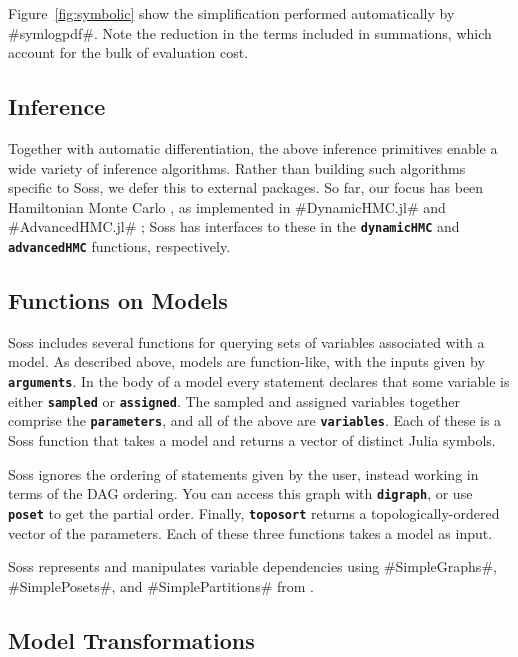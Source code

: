 \documentclass[anonymous=false, %
               format=acmsmall, %
               review=true, %
               screen=true, %
               nonacm=true]{acmart}
\begin{document}
Figure~\ref{fig:symbolic} show the simplification performed automatically by \jl#symlogpdf#. Note the reduction in the terms included in summations, which account for the bulk of evaluation cost. 

\subsection{Inference}

Together with automatic differentiation, the above inference primitives enable a wide variety of inference algorithms. Rather than building such algorithms specific to Soss, we defer this to external packages. So far, our focus has been Hamiltonian Monte Carlo \cite{Neal2011}, as implemented in \jl#DynamicHMC.jl# \cite{tamas_k_papp_2019_3590018} and \jl#AdvancedHMC.jl# \cite{ge2018t}; Soss has interfaces to these in the {\bf \texttt{dynamicHMC}} and {\bf \texttt{advancedHMC}} functions, respectively.

\subsection{Functions on Models}

Soss includes several functions for querying sets of variables associated with a model. As described above, models are function-like, with the inputs given by {\bf \texttt{arguments}}. In the body of a model every statement declares that some variable is either {\bf \texttt{sampled}} or {\bf \texttt{assigned}}. The sampled and assigned variables together comprise the {\bf \texttt{parameters}}, and all of the above are {\bf \texttt{variables}}. Each of these is a Soss function that takes a model and returns a vector of distinct Julia symbols.

Soss ignores the ordering of statements given by the user, instead working in terms of the DAG ordering. You can access this graph with {\bf \texttt{digraph}}, or use {\bf \texttt{poset}} to get the partial order. Finally, {\bf \texttt{toposort}} returns a topologically-ordered vector of the parameters. Each of these three functions takes a model as input.

Soss represents and manipulates variable dependencies using \jl#SimpleGraphs#, \jl#SimplePosets#, and \jl#SimplePartitions# from \cite{SimpleWorld}.
 

\subsection{Model Transformations}
\end{document}
